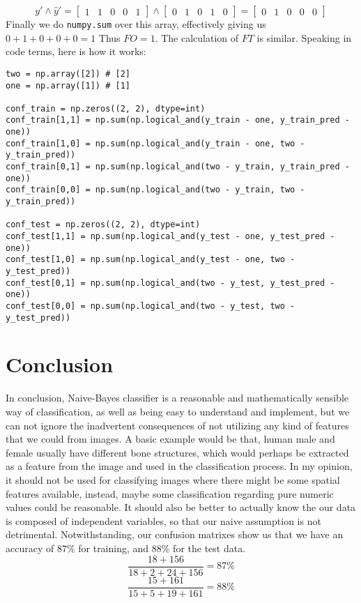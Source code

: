 \documentclass[12pt,reqno]{amsart}
\newcommand{\code}[1]{\texttt{#1}}
\begin{document}
$$
y' \land \hat{y}' =  \left[\begin{matrix} 1 & 1 & 0 & 0 & 1 \end{matrix} \right] \land \left[\begin{matrix} 0 & 1 & 0 & 1 & 0\end{matrix} \right] =  \left[\begin{matrix} 0 & 1 & 0 & 0 & 0 \end{matrix} \right]
$$
Finally we do \code{numpy.sum} over this array, effectively giving us $0 + 1 + 0 + 0 + 0 = 1$
Thus $FO= 1$. The calculation of $FT$ is similar. 
\newpage
Speaking in code terms, here is how it works:
\begin{lstlisting}
two = np.array([2]) # [2]
one = np.array([1]) # [1]

conf_train = np.zeros((2, 2), dtype=int)
conf_train[1,1] = np.sum(np.logical_and(y_train - one, y_train_pred - one))
conf_train[1,0] = np.sum(np.logical_and(y_train - one, two - y_train_pred))
conf_train[0,1] = np.sum(np.logical_and(two - y_train, y_train_pred - one))
conf_train[0,0] = np.sum(np.logical_and(two - y_train, two - y_train_pred))

conf_test = np.zeros((2, 2), dtype=int)
conf_test[1,1] = np.sum(np.logical_and(y_test - one, y_test_pred - one))
conf_test[1,0] = np.sum(np.logical_and(y_test - one, two - y_test_pred))
conf_test[0,1] = np.sum(np.logical_and(two - y_test, y_test_pred - one))
conf_test[0,0] = np.sum(np.logical_and(two - y_test, two - y_test_pred))
\end{lstlisting}
\section{Conclusion}
In conclusion, Naive-Bayes classifier is a reasonable and mathematically sensible way of classification, as well as being easy to understand and implement, but we can not ignore the inadvertent consequences of not utilizing any kind of features that we could from images. A basic example would be that, human male and female usually have different bone structures, which would perhaps be extracted as a feature from the image and used in the classification process. In my opinion, it should not be used for classifying images where there might be some spatial features available, instead, maybe some classification regarding pure numeric values could be reasonable. It should also be better to actually know the our data is composed of independent variables, so that our naive assumption is not detrimental. Notwithstanding, our confusion matrixes show us that we have an accuracy of $87\%$ for training, and $88\%$ for the test data.
$$
\frac{18+156}{18+2+24+156} = 87\%
$$
$$
\frac{15+161}{15+5+19+161} = 88\%
$$
\end{document}

